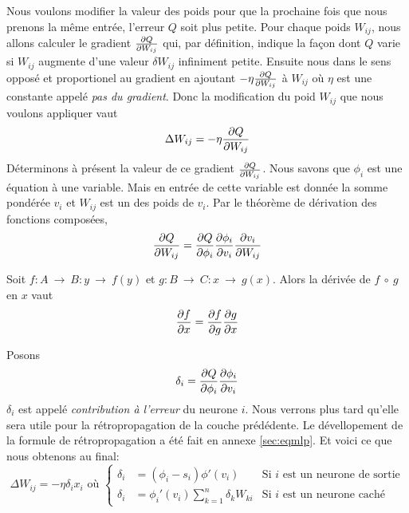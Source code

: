 {Nous voulons modifier la valeur des poids pour que la prochaine fois que nous prenons la même entrée, l'erreur $Q$ soit plus petite.
Pour chaque poids $W_{ij}$, nous allons calculer le gradient $\frac{\partial Q}{\partial W_{ij}}$ qui, par définition, indique la façon dont $Q$ varie si $W_{ij}$ augmente d'une valeur $\delta W_{ij}$ infiniment petite.
Ensuite nous  dans le sens opposé et proportionel au gradient en ajoutant $-\eta\frac{\partial Q}{\partial W_{ij}}$ à $W_{ij}$ où $\eta$ est une constante appelé \emph{pas du gradient}.
Donc la modification du poid $W_{ij}$ que nous voulons appliquer vaut
\begin{equation}%
 \Delta W_{ij} = -\eta\partiel{Q}{W_{ij}}
\end{equation}
Déterminons à présent la valeur de ce gradient $\frac{\partial Q}{\partial W_{ij}}$.
Nous savons que $\phi_i$ est une équation à une variable.
Mais en entrée de cette variable est donnée la somme pondérée $v_i$ et $W_{ij}$ est un des poids de $v_i$.
Par le théorème de dérivation des fonctions composées,
\begin{equation}%
 \partiel{Q}{W_{ij}} = \partiel{Q}{\phi_i} \partiel{\phi_i}{v_i} \partiel{v_i}{W_{ij}}
\end{equation}
\begin{thm}
Soit $f:A~\rightarrow~B : y~\rightarrow~f(y)$ et $g:B~\rightarrow~C : x~\rightarrow~g(x)$. Alors la dérivée de $f~\circ~g$ en $x$ vaut
\[\frac{\partial f}{\partial x} = \frac{\partial f}{\partial g} \frac{\partial g}{\partial x}\]
\end{thm}
Posons
\begin{equation}%
 \delta_i = \partiel{Q}{\phi_i} \partiel{\phi_i}{v_i}
\end{equation}
$\delta_i$ est appelé \emph{contribution à l'erreur} du neurone $i$.
Nous verrons plus tard qu'elle sera utile pour la rétropropagation de la couche prédédente.
Le dévellopement de la formule de rétropropagation a été fait en annexe \ref{sec:eqmlp}.
Et voici ce que nous obtenons au final:\\
\begin{equation}\label{eq:mlpretro}
 \Delta W_{ij} = -\eta \delta_i x_i \text{~où~}\left\{
  \begin{array}{lll}
   \delta_i & = (\phi_i - s_i)\phi'(v_i) & \text{Si~} i \text{~est un neurone de sortie}\\
   \delta_i & = \phi_i'(v_i) \sum_{k=1}^{n} \delta_k W_{ki} & \text{Si~} i \text{~est un neurone caché}
  \end{array}
 \right.
\end{equation}

}
